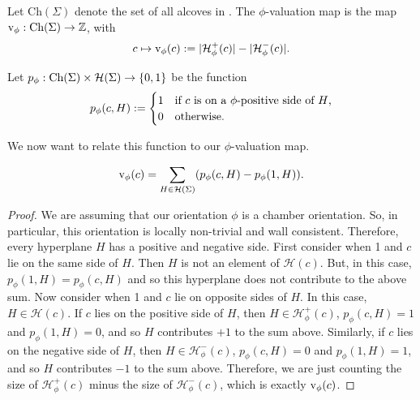 \documentclass[11pt]{article}
\begin{document}
\begin{definition}
    Let Ch$(\Sigma)$ denote the set of all alcoves in \sg. The $\phi$-valuation map is the map $\textnormal{v}_\phi:\textnormal{Ch}(\Sigma)\to\mathbb{Z}$, with
    \[c\mapsto \textnormal{v}_\phi(c):= | \mathcal{H}_{\phi}^+(c)| -| \mathcal{H}_{\phi}^-(c)| .\]
\end{definition}

\begin{definition}
    Let $p_\phi : \textnormal{Ch}(\Sigma)\times \mathcal{H}(\Sigma)\to \{0,1\}$ be the function 
    \[p_\phi(c,H):= \begin{cases}
        1 & \textnormal{if $c$ is on a $\phi$-positive side of $H$,}\\
        0 & \textnormal{otherwise.}
    \end{cases}\]
\end{definition}

We now want to relate this function to our $\phi$-valuation map.

\begin{lemma}
    \[\textnormal{v}_\phi(c)=\sum_{H\in\mathcal{H}(\Sigma)}(p_{\phi}(c,H)-p_\phi(1,H)).\]
\end{lemma}

\begin{proof}
    We are assuming that our orientation $\phi$ is a chamber orientation. So, in particular, this orientation is locally non-trivial and wall consistent. Therefore, every hyperplane $H$ has a positive and negative side. First consider when 1 and $c$ lie on the same side of $H$. Then $H$ is not an element of $\mathcal{H}(c)$. But, in this case, $p_\phi(1,H)=p_\phi(c,H)$ and so this hyperplane does not contribute to the above sum. 
    Now consider when 1 and $c$ lie on opposite sides of $H$. In this case, $H\in \mathcal{H}(c)$. If $c$ lies on the positive side of $H$, then $H\in\mathcal{H}_{\phi}^+(c)$, $p_\phi(c,H)=1$ and $p_\phi(1,H)=0$, and so $H$ contributes $+1$ to the sum above. Similarly, if $c$ lies on the negative side of $H$, then $H\in\mathcal{H}_{\phi}^-(c)$, $p_\phi(c,H)=0$ and $p_\phi(1,H)=1$, and so $H$ contributes $-1$ to the sum above. Therefore, we are just counting the size of $\mathcal{H}_{\phi}^+(c)$ minus the size of $\mathcal{H}_{\phi}^-(c)$, which is exactly $\textnormal{v}_\phi(c)$. 
\end{proof}


\end{document}

